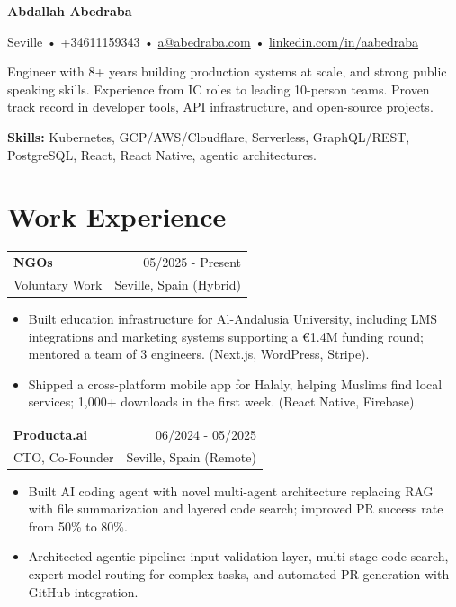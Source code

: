\documentclass[10pt,a4paper]{article}
\makeatletter
\newcommand{\resumeSubheading}[4]{
    \vspace{4pt}
    \begin{tabular*}{\textwidth}{@{}l@{\extracolsep{\fill}}r@{}}
        \textbf{#1} & #2 \\
        #3 & #4
    \end{tabular*}
    \vspace{-4pt}
}
\makeatother
\begin{document}
{\Huge \textbf{\color{headerred}Abdallah Abedraba}}

\vspace{8pt}

Seville • +34611159343 • \href{mailto:a@abedraba.com}{a@abedraba.com} • \href{https://linkedin.com/in/aabedraba}{linkedin.com/in/aabedraba}

\vspace{10pt}

Engineer with 8+ years building production systems at scale, and strong public speaking skills. Experience from IC roles to leading 10-person teams. Proven track record in developer tools, API infrastructure, and open-source projects.

\vspace{8pt}

\textbf{Skills:} Kubernetes, GCP/AWS/Cloudflare, Serverless, GraphQL/REST, PostgreSQL, React, React Native, agentic architectures.

\section{Work Experience}

\resumeSubheading
{NGOs}{05/2025 - Present}
{Voluntary Work}{Seville, Spain (Hybrid)}

\begin{itemize}
    \item Built education infrastructure for Al-Andalusia University, including LMS integrations and marketing systems supporting a \euro{}1.4M funding round; mentored a team of 3 engineers. (Next.js, WordPress, Stripe).
    \item Shipped a cross-platform mobile app for Halaly, helping Muslims find local services; 1,000+ downloads in the first week. (React Native, Firebase).
\end{itemize}


\resumeSubheading
{Producta.ai}{06/2024 - 05/2025}
{CTO, Co-Founder}{Seville, Spain (Remote)}

\begin{itemize}
    \item Built AI coding agent with novel multi-agent architecture replacing RAG with file summarization and layered code search; improved PR success rate from 50\% to 80\%.
    \item Architected agentic pipeline: input validation layer, multi-stage code search, expert model routing for complex tasks, and automated PR generation with GitHub integration.

\end{itemize}
\end{document}
